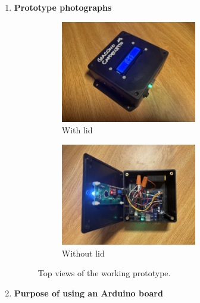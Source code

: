 \documentclass[10pt]{article}
\begin{document}
\begin{enumerate}[label=\Alph*.]
	\item \textbf{Prototype photographs}
	      \begin{figure}[H] \centering
		      \begin{subfigure}[b]{0.45\textwidth}
			      \centering
			      \includegraphics[width=0.7\textwidth]{cad/f-1.jpeg}
			      \caption{With lid}
		      \end{subfigure} \hfill
		      \begin{subfigure}[b]{0.45\textwidth}
			      \centering
			      \includegraphics[width=0.7\textwidth]{cad/f-2.jpeg}
			      \caption{Without lid}
		      \end{subfigure}
		      \caption{Top views of the working prototype.}
	      \end{figure}


	\item \textbf{Purpose of using an Arduino board}


\end{enumerate}
\end{document}
